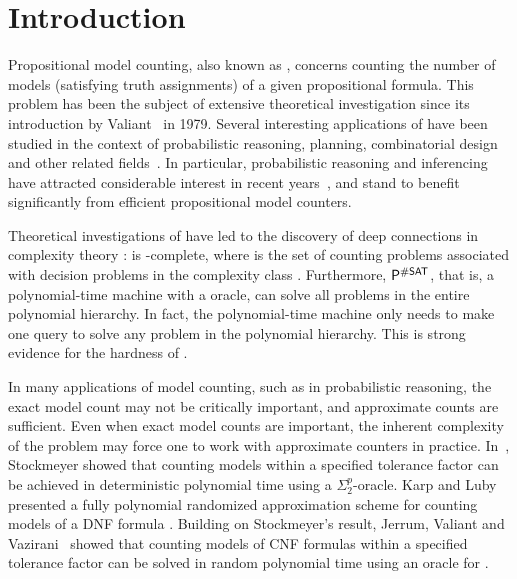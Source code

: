\section{Introduction}\label{sec:intro}
Propositional model counting, also known as {\sharpSAT}, concerns 
counting the number of models (satisfying truth assignments) of a
given propositional formula.  This problem has been the subject of
extensive theoretical investigation since its introduction by
Valiant~\cite{valiant1979complexity} in 1979.  Several interesting 
applications of {\sharpSAT} have been studied in the context of 
probabilistic reasoning, planning, combinatorial design and other 
related fields~\cite{Roth1996,Bacchus04algorithmsand,domshlak2007}.  
In particular, probabilistic reasoning and inferencing have attracted
considerable interest in recent years~\cite{GSS08}, and stand to
benefit significantly from efficient propositional model counters.
%
%
%
%
%
%
%
%
%
%
%

%
Theoretical investigations of {\sharpSAT} have led to the discovery of 
deep connections in complexity theory 
\cite{Angluin1980,simon77,toda1989computational}: 
{\sharpSAT} is {\sharpP}-complete, where {\sharpP} is the set of
counting problems associated with decision problems in the complexity
class {\NP}.  Furthermore, $\mathsf{P}^{\#\mathsf{SAT}}$, that is,
a polynomial-time machine with a {\sharpSAT} oracle, can solve all 
problems in the entire polynomial hierarchy. In fact, the 
polynomial-time machine only needs to make one {\sharpSAT} query to 
solve any problem in the polynomial hierarchy. This is strong evidence 
for the hardness of {\sharpSAT}.
%
%
%
%
%
%
%
%
%
%
%
%
%

In many applications of model counting, such as in probabilistic
reasoning, the exact model count may not be critically important, and
approximate counts are sufficient.  Even when exact model counts are
important, the inherent complexity of the problem may force one to
work with approximate counters in practice.  In~\cite{Stockmeyer83},
Stockmeyer showed that counting models within a specified tolerance
factor can be achieved in deterministic polynomial time using a
$\Sigma_2^p$-oracle.  Karp and Luby presented a fully polynomial
randomized approximation scheme for counting models of a DNF formula
\cite{KarpLuby1989}.  Building on Stockmeyer's result, Jerrum, Valiant 
and Vazirani~\cite{Jerr} showed that counting models of CNF formulas
within a specified tolerance factor can be solved in random polynomial 
time using an oracle for {\SAT}.  
%
%
%
%
%

